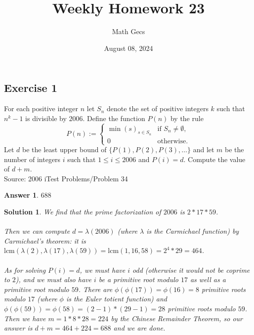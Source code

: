 \documentclass[12pt]{article}
\title{Weekly Homework 23}
\author{Math Gecs}
\date{August 08, 2024}
\newtheorem*{answer*}{Answer}
\newtheorem*{solution*}{Solution}
\begin{document}
\maketitle

\subsection*{Exercise 1}
For each positive integer $n$ let $S_n$ denote the set of positive integers $k$ such that $n^k-1$ is divisible by $2006$. Define the function $P(n)$ by the rule\[P(n):=\begin{cases}\min(s)_{s\in S_n}&\text{if }S_n\neq\emptyset,\\0&\text{otherwise}.\end{cases}\]Let $d$ be the least upper bound of $\{P(1),P(2),P(3),\ldots\}$ and let $m$ be the number of integers $i$ such that $1\leq i\leq 2006$ and $P(i) = d$. Compute the value of $d+m$.\\

Source: 2006 iTest Problems/Problem 34\\

\begin{answer*}
$688$
\end{answer*}

\begin{solution*}
We find that the prime factorization of $2006$ is $2*17*59$.
\\ \\
Then we can compute $d = \lambda(2006)$ (where $\lambda$ is the Carmichael function) by Carmichael's theorem: it is $\text{lcm}(\lambda(2), \lambda(17), \lambda(59)) = \text{lcm}(1, 16, 58) = 2^4 * 29 = 464$.
\\ \\
As for solving $P(i) = d$, we must have $i$ odd (otherwise it would not be coprime to $2$), and we must also have $i$ be a primitive root modulo $17$ as well as a primitive root modulo $59$. There are $\phi(\phi(17)) = \phi(16) = 8$ primitive roots modulo $17$ (where $\phi$ is the Euler totient function) and $\phi(\phi(59)) = \phi(58) = (2-1)*(29-1) = 28$ primitive roots modulo $59$. Then we have $m = 1 * 8 * 28 = 224$ by the Chinese Remainder Theorem, so our answer is $d + m = 464 + 224 = 688$ and we are done.
\end{solution*}
\end{document}
